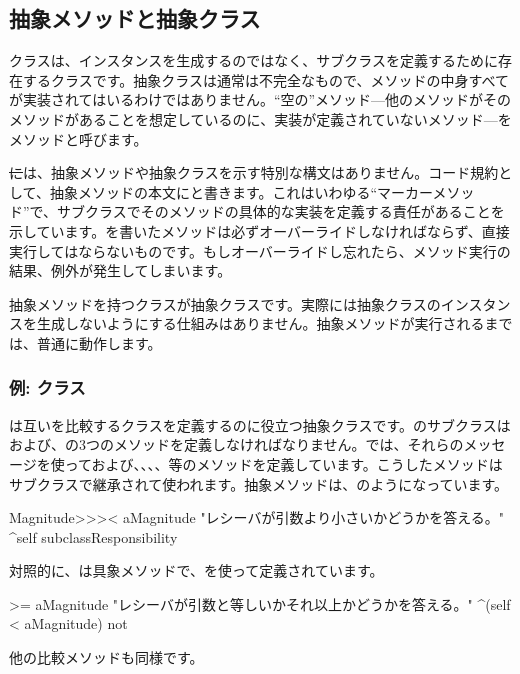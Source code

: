 \documentclass[a4paper,10pt,twoside]{book}
\begin{document}
\subsection{抽象メソッドと抽象クラス}

クラスは、インスタンスを生成するのではなく、サブクラスを定義するために存在するクラスです。抽象クラスは通常は不完全なもので、メソッドの中身すべてが実装されてはいるわけではありません。``空の''メソッド---他のメソッドがそのメソッドがあることを想定しているのに、実装が定義されていないメソッド---をメソッドと呼びます。

\st には、抽象メソッドや抽象クラスを示す特別な構文はありません。コード規約として、抽象メソッドの本文に\mbox{}と書きます。これはいわゆる``マーカーメソッド''で、サブクラスでそのメソッドの具体的な実装を定義する責任があることを示しています。を書いたメソッドは必ずオーバーライドしなければならず、直接実行してはならないものです。もしオーバーライドし忘れたら、メソッド実行の結果、例外が発生してしまいます。

抽象メソッドを持つクラスが抽象クラスです。実際には抽象クラスのインスタンスを生成しないようにする仕組みはありません。抽象メソッドが実行されるまでは、普通に動作します。

\subsubsection{例: クラス}
は互いを比較するクラスを定義するのに役立つ抽象クラスです。のサブクラスは\ct{<}および\ct{=}、の3つのメソッドを定義しなければなりません。では、それらのメッセージを使って\ct{>}および\ct{>=}、\ct{<=}、、、等のメソッドを定義しています。こうしたメソッドはサブクラスで継承されて使われます。抽象メソッドは、のようになっています。

\begin{method}[MagnitudeLessThan]{}
Magnitude>>>< aMagnitude 
	"レシーバが引数より小さいかどうかを答える。"
	^self subclassResponsibility
\end{method}

\noindent
対照的に、は具象メソッドで、\ct{<}を使って定義されています。

\begin{method}[Magnitude>=]{}
>= aMagnitude 
	"レシーバが引数と等しいかそれ以上かどうかを答える。"
	^(self < aMagnitude) not
\end{method}
他の比較メソッドも同様です。
\end{document}
